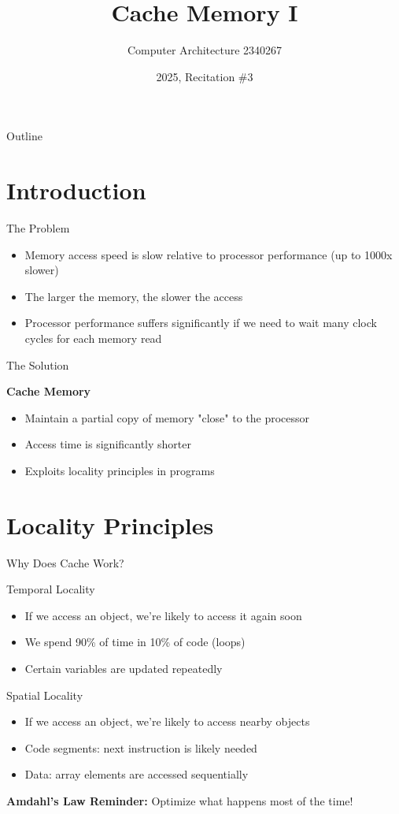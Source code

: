 \documentclass[aspectratio=169,12pt]{beamer}
\title{Cache Memory I}
\author{Computer Architecture 2340267}
\date{2025, Recitation \#3}
\begin{document}
\frame{\titlepage}

\begin{frame}{Outline}
\tableofcontents
\end{frame}

\section{Introduction}
\begin{frame}{The Problem}
\begin{itemize}
    \item Memory access speed is slow relative to processor performance (up to 1000x slower)
    \item The larger the memory, the slower the access
    \item Processor performance suffers significantly if we need to wait many clock cycles for each memory read
\end{itemize}
\end{frame}

\begin{frame}{The Solution}
\begin{center}
\textbf{Cache Memory}
\end{center}
\begin{itemize}
    \item Maintain a partial copy of memory "close" to the processor
    \item Access time is significantly shorter
    \item Exploits locality principles in programs
\end{itemize}
\end{frame}

\section{Locality Principles}
\begin{frame}{Why Does Cache Work?}
\begin{block}{Temporal Locality}
\begin{itemize}
    \item If we access an object, we're likely to access it again soon
    \item We spend 90\% of time in 10\% of code (loops)
    \item Certain variables are updated repeatedly
\end{itemize}
\end{block}

\begin{block}{Spatial Locality}
\begin{itemize}
    \item If we access an object, we're likely to access nearby objects
    \item Code segments: next instruction is likely needed
    \item Data: array elements are accessed sequentially
\end{itemize}
\end{block}

\textbf{Amdahl's Law Reminder:} Optimize what happens most of the time!
\end{frame}
\end{document}
